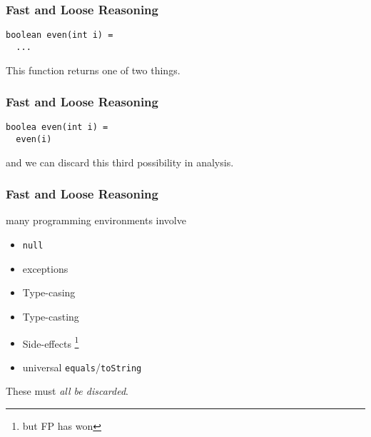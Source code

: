 \begin{frame}[fragile]
\frametitle{Fast and Loose Reasoning}
\begin{lstlisting}
boolean even(int i) =
  ...
\end{lstlisting}
This function returns one of two things.
\end{frame}

\begin{frame}[fragile]
\frametitle{Fast and Loose Reasoning}
\begin{lstlisting}[style=scala]
boolea even(int i) =
  even(i)
\end{lstlisting}
and we can discard this third possibility in analysis.
\end{frame}

\begin{frame}[fragile]
\frametitle{Fast and Loose Reasoning}
\begin{block}{many programming environments involve}
\begin{itemize}
  \item \lstinline{null}
  \item exceptions
  \item Type-casing
  \item Type-casting
  \item Side-effects \footnote{but FP has won}
  \item universal \lstinline{equals}/\lstinline{toString}
\end{itemize}
\end{block}
These must \emph{all be discarded}.
\end{frame}

